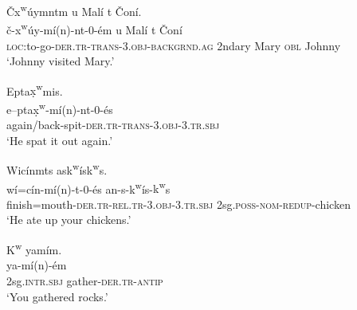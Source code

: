 \documentclass[output=paper,colorlinks,citecolor=brown]{langscibook}
\begin{document}
\ea 
\label{ex-thomason-31}
\v{C}{x\textsuperscript w}\'uymntm {\textltilde}u Mal\'i t \v{C}on\'i. \\
 \gll  \v{c}-{x\textsuperscript w}\'uy-m\'i(n)-nt-0-\'em {\textltilde}u Mal\'i t \v{C}on\'i \\
\textsc{loc}:to-go-\textsc{der.tr-trans}-3.\textsc{obj}-\textsc{backgrnd.ag} 2ndary Mary \textsc{obl} Johnny \\
 \glt `Johnny visited Mary.'
 \z

\ea 
\label{ex-thomason-32}
E{\textltilde}pta{\d{x}\textsuperscript w}mis. \\
\gll e{\textltilde}--pta{\d{x}\textsuperscript w}-m\'i(n)-nt-0-\'es \\ again/back-spit-\textsc{der.tr-trans}-3.\textsc{obj}-3.\textsc{tr.sbj} \\
\glt `He spat it out again.'
\z

\ea 
\label{ex-thomason-33}
Wic\'inm{\textltilde}ts ask\textsuperscript w\'is{k\textsuperscript w}s. \\
\gll w\'i\textglotstop=c\'in-m\'i(n)-{\textltilde}t-0-\'es
 an-s-k\textsuperscript w\'is-{k\textsuperscript w}s \\
finish=mouth-\textsc{der.tr-rel.tr}-3.\textsc{obj}-3.\textsc{tr.sbj}
2sg.\textsc{poss}-\textsc{nom-redup}-chicken \\
\glt `He ate up your chickens.'
\z

\ea 
\label{ex-thomason-34}
{K\textsuperscript w} ya{\textglotstop}m\'im. \\
 ya\textglotstop-m\'i(n)-\'em \\ 
2sg.\textsc{intr.sbj} gather-\textsc{der.tr-antip} \\    
\glt `You gathered rocks.'
\z
\end{document}
